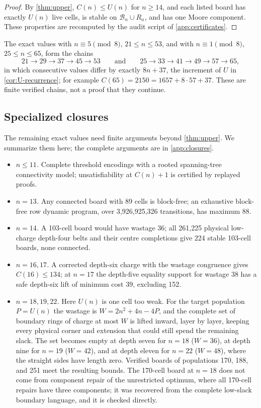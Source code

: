 \documentclass[10pt]{article}
\theoremstyle{remark}
\newcommand{\B}{\mathcal B}
\begin{document}
\begin{proof}
By \cref{thm:upper}, $C(n)\le U(n)$ for $n\ge14$, and each listed board has
exactly $U(n)$ live cells, is stable on $\B_n\cup R_n$, and has one Moore
component.  These properties are recomputed by the audit script of
\cref{app:certificates}.
\end{proof}

The exact values with $n\equiv5\pmod8$, $21\le n\le53$, and with
$n\equiv1\pmod8$, $25\le n\le65$, form the chains
\[
 21\to29\to37\to45\to53
 \qquad\text{and}\qquad
 25\to33\to41\to49\to57\to65,
\]
in which consecutive values differ by exactly $8n+37$, the increment of $U$ in
\cref{cor:U-recurrence}; for example $C(65)=2150=1657+8\cdot57+37$.  These are
finite verified chains, not a proof that they continue.

\subsection{Specialized closures}\label{sec:special}

The remaining exact values need finite arguments beyond
\cref{thm:upper}.  We summarize them here; the complete arguments are in
\cref{app:closures}.

\begin{itemize}[leftmargin=1.2em,label={}]
\item \emph{$n\le11$.} Complete threshold encodings with a rooted spanning-tree
connectivity model; unsatisfiability at $C(n)+1$ is certified by replayed
proofs.
\item \emph{$n=13$.} Any connected board with 89 cells is block-free; an exhaustive
block-free row dynamic program, over 3,926,925,326 transitions, has maximum 88.
\item \emph{$n=14$.} A 103-cell board would have wastage 36; all 261,225 physical
low-charge depth-four belts and their centre completions give 224 stable
103-cell boards, none connected.
\item \emph{$n=16,17$.} A corrected depth-six charge with the wastage congruence gives
$C(16)\le134$; at $n=17$ the depth-five equality support for wastage $38$ has a
safe depth-six lift of minimum cost $39$, excluding 152.
\item \emph{$n=18,19,22$.} Here $U(n)$ is one cell too weak.  For the target
population $P=U(n)$ the wastage is $W=2n^2+4n-4P$, and the complete set of
boundary rings of charge at most $W$ is lifted inward, layer by layer, keeping
every physical corner and extension that could still spend the remaining
slack.  The set becomes empty at depth seven for $n=18$ ($W=36$), at depth nine
for $n=19$ ($W=42$), and at depth eleven for $n=22$ ($W=48$), where the
straight sides have length zero.  Verified boards of populations 170, 188, and
251 meet the resulting bounds.  The 170-cell board at $n=18$ does not come from
component repair of the unrestricted optimum, where all 170-cell repairs have
three components; it was recovered from the complete low-slack boundary
language, and it is checked directly.
\end{itemize}
\end{document}
